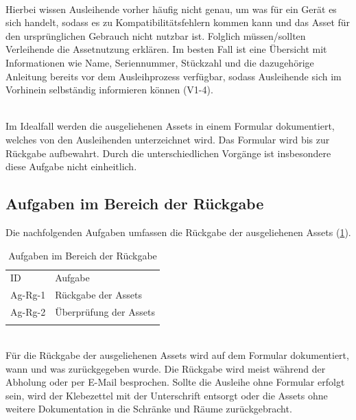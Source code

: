{\sffamily\color{maincolor}{Ag-Au-2 | Erläuterung der Assetnutzung}}\\
Hierbei wissen Ausleihende vorher häufig nicht genau, um was für ein Gerät es sich handelt, sodass
es zu Kompatibilitätsfehlern kommen kann und das Asset für den ursprünglichen Gebrauch nicht nutzbar
ist. Folglich müssen/sollten Verleihende die Assetnutzung erklären. Im besten Fall ist eine
Übersicht mit Informationen wie Name, Seriennummer, Stückzahl und die dazugehörige Anleitung bereits
vor dem Ausleihprozess verfügbar, sodass Ausleihende sich im Vorhinein selbständig informieren
können (V1-4).

{\sffamily\color{maincolor}{Ag-Au-3 | Unterschreiben des Formulars}}\\
Im Idealfall werden die ausgeliehenen Assets in einem Formular dokumentiert, welches von den
Ausleihenden unterzeichnet wird. Das Formular wird bis zur Rückgabe aufbewahrt. Durch die
unterschiedlichen Vorgänge ist insbesondere diese Aufgabe nicht einheitlich.

\subsection{Aufgaben im Bereich der Rückgabe}
Die nachfolgenden Aufgaben umfassen die Rückgabe der ausgeliehenen Assets (\ref{table:Ag-Rg}).
\begin{table}[h]
        \centering
        \caption{Aufgaben im Bereich der Rückgabe}
        \begin{tabular}{ll}
                \arrayrulecolor{maincolor}\hline
                \sffamily\color{maincolor}ID & \sffamily\color{maincolor}Aufgabe \\
                \arrayrulecolor{maincolor}\hline
                Ag-Rg-1                      & Rückgabe der Assets               \\
                Ag-Rg-2                      & Überprüfung der Assets            \\
                \arrayrulecolor{maincolor}\hline
        \end{tabular}
        \label{table:Ag-Rg}
\end{table}

{\sffamily\color{maincolor}{Ag-Rg-1 | Rückgabe der Assets}} \\
Für die Rückgabe der ausgeliehenen Assets wird auf dem Formular dokumentiert, wann
und was zurückgegeben wurde. Die Rückgabe wird meist während der Abholung oder per E-Mail
besprochen. Sollte die Ausleihe ohne Formular erfolgt sein, wird der Klebezettel mit der
Unterschrift entsorgt oder die Assets ohne weitere Dokumentation in die Schränke und Räume
zurückgebracht.

